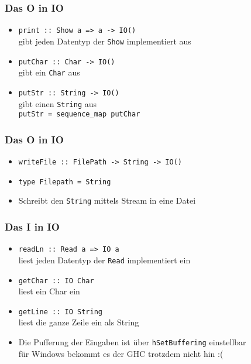 \documentclass[fleqn,11pt,aspectratio=43]{beamer}
\begin{document}
\begin{frame}
\frametitle{Das O in IO}
\begin{block}{\vspace*{-3ex}}
\begin{itemize}
  \item \lstinline|print :: Show a => a -> IO()| \\ gibt jeden Datentyp der \lstinline|Show| implementiert aus
  \item \lstinline|putChar :: Char -> IO()| \\ gibt ein \lstinline|Char| aus
  \item \lstinline|putStr :: String -> IO()|\\ gibt einen \lstinline|String| aus \\
  \lstinline|putStr = sequence_map putChar|
\end{itemize}
\end{block}
\end{frame}

\begin{frame}
\frametitle{Das O in IO}
\begin{block}{\vspace*{-3ex}}
\begin{itemize}
  \item \lstinline|writeFile :: FilePath -> String -> IO()| 
  \item \lstinline|type Filepath = String|
  \item Schreibt den \lstinline|String| mittels Stream in eine Datei
\end{itemize}
\end{block}
\end{frame}

\begin{frame}
\frametitle{Das I in IO}
\begin{block}{\vspace*{-3ex}}
\begin{itemize}
  \item \lstinline|readLn :: Read a => IO a|\\ liest jeden Datentyp der \lstinline|Read| implementiert ein
  \item \lstinline|getChar :: IO Char|\\ liest ein Char ein
  \item \lstinline|getLine :: IO String|\\ liest die ganze Zeile ein als String
  \item Die Pufferung der Eingaben ist über \lstinline|hSetBuffering| einstellbar\\ für Windows bekommt es der GHC trotzdem nicht hin :(
\end{itemize}
\end{block}
\end{frame}
\end{document}
